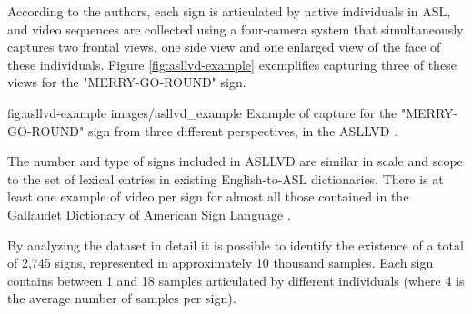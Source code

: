 
According to the authors, each sign is articulated by native individuals in ASL, and video sequences are collected using a four-camera system that simultaneously captures two frontal views, one side view and one enlarged view of the face of these individuals. Figure \ref{fig:asllvd-example} exemplifies capturing three of these views for the "MERRY-GO-ROUND" sign. 


\image
    {fig:asllvd-example}
    {images/asllvd_example}
    {Example of capture for the "MERRY-GO-ROUND" sign from three different perspectives, in the ASLLVD \cite[p. 2]{athitsos-asllvd-2008}.}
    
The number and type of signs included in ASLLVD are similar in scale and scope to the set of lexical entries in existing English-to-ASL dictionaries. There is at least one example of video per sign for almost all those contained in the Gallaudet Dictionary of American Sign Language \cite{athitsos-asllvd-2008, gallaudet-2005}.


By analyzing the dataset in detail it is possible to identify the existence of a total of 2,745 signs, represented in approximately 10 thousand samples. Each sign contains between 1 and 18 samples articulated by different individuals (where 4 is the average number of samples per sign).

